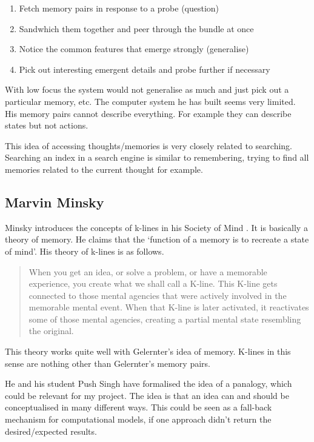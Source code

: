 \begin{enumerate}
  \item Fetch memory pairs in response to a probe (question)
  \item Sandwhich them together and peer through the bundle at once
  \item Notice the common features that emerge strongly (generalise)
  \item Pick out interesting emergent details and probe further if necessary
\end{enumerate}

With low focus the system would not generalise as much and just pick out a particular memory, etc. The computer system he has built seems very limited. His memory pairs cannot describe everything. For example they can describe states but not actions.

This idea of accessing thoughts/memories is very closely related to searching. Searching an index in a search engine is similar to remembering, trying to find all memories related to the current thought for example.


\subsection*{Marvin Minsky}

Minsky introduces the concepts of k-lines in his Society of Mind \autocite{Minsky1980, Minsky1988}. It is basically a theory of memory. He claims that the `function of a memory is to recreate a state of mind'. His theory of k-lines is as follows.

\begin{quotation}
  When you get an idea, or solve a problem, or have a memorable experience, you create what we shall call a K-line. This K-line gets connected to those mental agencies that were actively involved in the memorable mental event. When that K-line is later activated, it reactivates some of those mental agencies, creating a partial mental state resembling the original. 
\end{quotation}

This theory works quite well with Gelernter's idea of memory. K-lines in this sense are nothing other than Gelernter's memory pairs.

He and his student Push Singh have formalised the idea of a panalogy, which could be relevant for my project. The idea is that an idea can and should be conceptualised in many different ways. This could be seen as a fall-back mechanism for computational models, if one approach didn't return the desired/expected results.


